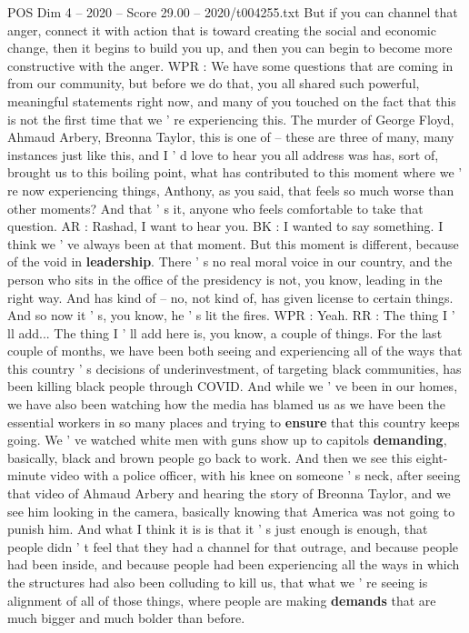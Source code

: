 \begin{textsample}{POS Dim 4 – 2020 – Score 29.00 – 2020/t004255.txt}
But if you can channel that anger, connect it with action that is toward creating the social and economic change, then it begins to build you up, and then you can begin to become more constructive with the anger.
WPR : We have some questions that are coming in from our community, but before we do that, you all shared such powerful, meaningful statements right now, and many of you touched on the fact that this is not the first time that we ' re experiencing this.
The murder of George Floyd, Ahmaud Arbery, Breonna Taylor, this is one of -- these are three of many, many instances just like this, and I ' d love to hear you all address was has, sort of, brought us to this boiling point, what has contributed to this moment where we ' re now experiencing things, Anthony, as you said, that feels so much worse than other moments?
And that ' s it, anyone who feels comfortable to take that question.
AR : Rashad, I want to hear you.
BK : I wanted to say something.
I think we ' ve always been at that moment.
But this moment is different, because of the void in \textbf{leadership}.
There ' s no real moral voice in our country, and the person who sits in the office of the presidency is not, you know, leading in the right way.
And has kind of -- no, not kind of, has given license to certain things.
And so now it ' s, you know, he ' s lit the fires.
WPR : Yeah.
RR : The thing I ' ll add...
The thing I ' ll add here is, you know, a couple of things.
For the last couple of months, we have been both seeing and experiencing all of the ways that this country ' s decisions of underinvestment, of targeting black communities, has been killing black people through COVID.
And while we ' ve been in our homes, we have also been watching how the media has blamed us as we have been the essential workers in so many places and trying to \textbf{ensure} that this country keeps going.
We ' ve watched white men with guns show up to capitols \textbf{demanding}, basically, black and brown people go back to work.
And then we see this eight-minute video with a police officer, with his knee on someone ' s neck, after seeing that video of Ahmaud Arbery and hearing the story of Breonna Taylor, and we see him looking in the camera, basically knowing that America was not going to punish him.
And what I think it is is that it ' s just enough is enough, that people didn ' t feel that they had a channel for that outrage, and because people had been inside, and because people had been experiencing all the ways in which the structures had also been colluding to kill us, that what we ' re seeing is alignment of all of those things, where people are making \textbf{demands} that are much bigger and much bolder than before.

\end{textsample}
